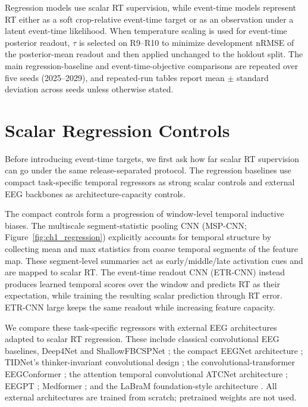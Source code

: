\documentclass[12pt]{article}
\begin{document}
Regression models use scalar RT supervision, while event-time models represent RT either as a soft crop-relative event-time target or as an observation under a latent event-time likelihood. When temperature scaling is used for event-time posterior readout, \(\tau\) is selected on R9--R10 to minimize development nRMSE of the posterior-mean readout and then applied unchanged to the holdout split. The main regression-baseline and event-time-objective comparisons are repeated over five seeds (2025--2029), and repeated-run tables report mean $\pm$ standard deviation across seeds unless otherwise stated.

\section{Scalar Regression Controls}
\label{sec:baseline_regression}

Before introducing event-time targets, we first ask how far scalar RT supervision can go under the same release-separated protocol. The regression baselines use compact task-specific temporal regressors as strong scalar controls and external EEG backbones as architecture-capacity controls.

The compact controls form a progression of window-level temporal inductive biases. The multiscale segment-statistic pooling CNN (MSP-CNN; Figure~\ref{fig:ch1_regression}) explicitly accounts for temporal structure by collecting mean and max statistics from coarse temporal segments of the feature map. These segment-level summaries act as early/middle/late activation cues and are mapped to scalar RT. The event-time readout CNN (ETR-CNN) instead produces learned temporal scores over the window and predicts RT as their expectation, while training the resulting scalar prediction through RT error. ETR-CNN large keeps the same readout while increasing feature capacity.

We compare these task-specific regressors with external EEG architectures adapted to scalar RT regression. These include classical convolutional EEG baselines, Deep4Net and ShallowFBCSPNet \citep{braindecode}; the compact EEGNet architecture \citep{lawhern2018eegnet}; TIDNet's thinker-invariant convolutional design \citep{kostas2020thinkerinvariance}; the convolutional-transformer EEGConformer \citep{song2023eegconformer}; the attention temporal convolutional ATCNet architecture \citep{altaheri2022atcnet}; EEGPT \citep{wang2024eegpt}; Medformer \citep{wang2024medformer}; and the LaBraM foundation-style architecture \citep{Jiang2024LaBraM}. All external architectures are trained from scratch; pretrained weights are not used.
\end{document}
